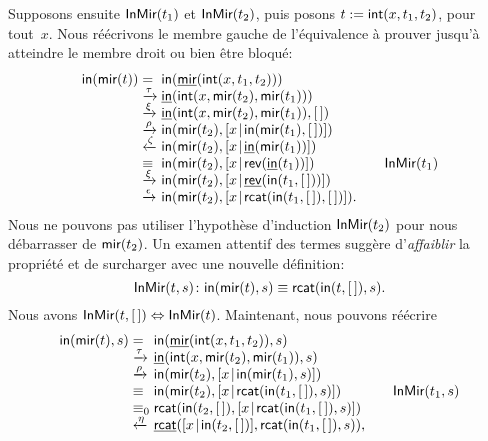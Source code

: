 Supposons ensuite \(\textsf{InMir}({t_1})\) et \(\textsf{InMir}({t_2})\), puis
posons \(t := \textsf{int}(x,t_1,t_2)\), pour tout~\(x\). Nous réécrivons
le membre gauche de l'équivalence à prouver jusqu'à atteindre le
membre droit ou bien être bloqué:
\begin{equation*}
\begin{array}{@{}r@{\;}l@{\;}l@{\qquad}r@{}}
\fun{in}(\fun{mir}(t)) & = &
\fun{in}(\ufun{mir}(\fun{int}(x,t_1,t_2)))\\
& \xrightarrow{\smash{\tau}}
& \ufun{in}(\fun{int}(x,\fun{mir}(t_2),\fun{mir}(t_1)))\\
& \xrightarrow{\smash{\xi}}
& \ufun{in}(\fun{int}(x,\fun{mir}(t_2),\fun{mir}(t_1)),\el)\\
& \xrightarrow{\smash{\rho}}
& \fun{in}(\fun{mir}(t_2),\cons{x}{\fun{in}(\fun{mir}(t_1),\el)})\\
& \xleftarrow{\smash{\zeta}}
& \fun{in}(\fun{mir}(t_2),\cons{x}{\ufun{in}(\fun{mir}(t_1))})\\
& \equiv
& \fun{in}(\fun{mir}(t_2),\cons{x}{\fun{rev}(\ufun{in}(t_1))})
& \IH{\pred{InMir}{t_1}}\\
& \xrightarrow{\smash{\xi}}
& \fun{in}(\fun{mir}(t_2),\cons{x}{\ufun{rev}(\fun{in}(t_1,\el))})\\
& \xrightarrow{\smash{\epsilon}}
& \fun{in}(\fun{mir}(t_2),\cons{x}{\fun{rcat}(\fun{in}(t_1,\el),\el)}).
\end{array}
\end{equation*}
Nous ne pouvons pas utiliser l'hypothèse d'induction
\(\textsf{InMir}({t_2})\) pour nous débarrasser de \(\textsf{mir}(t_2)\). Un
examen attentif des termes suggère d'\emph{affaiblir} la propriété et
de surcharger  avec une nouvelle définition:
\begin{equation*}
\textsf{InMir}({t,s}) \colon \textsf{in}(\textsf{mir}(t),s) \equiv
\textsf{rcat}(\textsf{in}(t,[\,]),s).
\end{equation*}
Nous avons \(\textsf{InMir}({t,[\,]}) \Leftrightarrow
\textsf{InMir}({t})\). Maintenant, nous pouvons réécrire
\begin{equation*}
\begin{array}{@{}r@{\;}l@{\;}l@{\qquad}r@{}}
\fun{in}(\fun{mir}(t),s)
& =
& \fun{in}(\ufun{mir}(\fun{int}(x,t_1,t_2)),s)\\
& \xrightarrow{\smash{\tau}}
& \ufun{in}(\fun{int}(x,\fun{mir}(t_2),\fun{mir}(t_1)),s)\\
& \xrightarrow{\smash{\rho}}
& \fun{in}(\fun{mir}(t_2),\cons{x}{\fun{in}(\fun{mir}(t_1),s)})\\
& \equiv
& \fun{in}(\fun{mir}(t_2),\cons{x}{\fun{rcat}(\fun{in}(t_1,\el),s)})
& \IH{\pred{InMir}{t_1,s}}\\
& \equiv_0
& \fun{rcat}(\fun{in}(t_2,\el),\cons{x}{\fun{rcat}(\fun{in}(t_1,\el),s)})\\
& \xleftarrow{\smash{\eta}}
& \ufun{rcat}(\cons{x}{\fun{in}(t_2,\el)},\fun{rcat}(\fun{in}(t_1,\el),s)),
\end{array}
\end{equation*}
